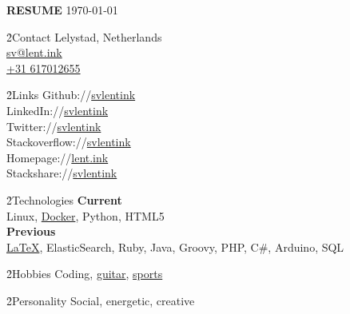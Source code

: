 \LARGE \textbf{RESUME}
\scriptsize \today \normalsize



\h{2}{Contact}{}
Lelystad, Netherlands \\
\href{mailto:sv@lent.ink}{sv@lent.ink} \\
\href{tel:0031617012655}{+31 617012655}

\h{2}{Links}{}
Github://\href{http://github.com/svlentink}{svlentink} \\
LinkedIn://\href{http://linkedin.com/in/svlentink}{svlentink} \\
Twitter://\href{http://twitter.com/svlentink}{svlentink} \\
Stackoverflow://\href{http://stackoverflow.com/users/3037245/svlentink}{svlentink} \\
Homepage://\href{http://lent.ink}{lent.ink} \\
Stackshare://\href{http://stackshare.io/svlentink/lent-ink}{svlentink}

\h{2}{Technologies}{}
\textbf{Current} \\
Linux,
\href{http://hub.docker.com/r/svlentink}{Docker},
Python,
HTML5
\\
\textbf{Previous} \\
\href{https://github.com/svlentink/resume}{LaTeX},
ElasticSearch,
Ruby,
Java,
Groovy,
PHP,
C\#,
Arduino,
SQL


\h{2}{Hobbies}{}
Coding,
\href{http://lent.ink/projects/chords}{guitar},
\href{http://lent.ink/projects/run}{sports}

\h{2}{Personality}{}
Social, energetic, creative

